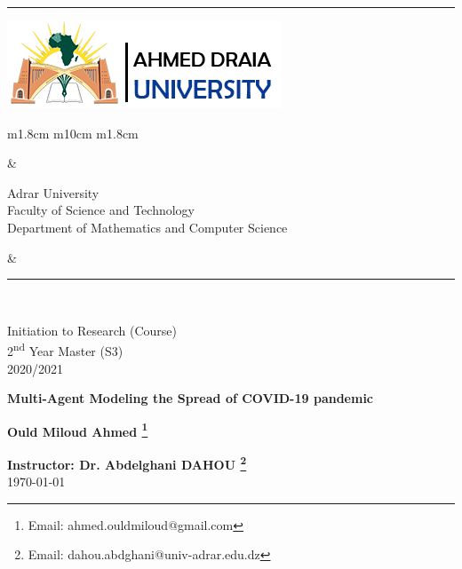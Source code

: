 \documentclass[paper=a4, fontsize=11.5pt]{scrartcl}
\numberwithin{equation}{section}		%
\numberwithin{figure}{section}			%
\numberwithin{table}{section}				%
\newcommand{\horrule}[1]{\rule{\linewidth}{#1}} 	%
\begin{document}
		
{\flushleft\horrule{2pt}
\begin{center}
{\includegraphics[height=0.09\textwidth]{Figs/logo_english.png}} 
\begin{tabular}{ m{1.8cm} m{10cm} m{1.8cm}}
\begin{center}
\end{center}
&
\begin{center} 
{\small
{Adrar University} \\
{Faculty of Science and Technology} \\
{Department of Mathematics and Computer Science}} \\

\end{center}
&

\begin{center}
\end{center}
\end{tabular}
\end{center}
\flushleft \horrule{2pt}\\[1cm]
}


\begin{center}

{
\huge  
Initiation to Research (Course) \\
\vspace{0.2cm}
2\textsuperscript{nd} Year Master (S3) \\
\vspace{0.2cm}
2020/2021}\\

\vspace{1cm}

{
\Huge   
\textbf{Multi-Agent Modeling the Spread of COVID-19 pandemic }}\\
\vspace{1cm}

{
\Large
\textbf{Ould Miloud Ahmed \footnote{Email: ahmed.ouldmiloud@gmail.com}}}\\
\vspace{4.5cm}

{
\large
\textbf{Instructor: Dr. Abdelghani DAHOU \footnote{Email: dahou.abdghani@univ-adrar.edu.dz}}}\\
\today
\end{center}
\pagebreak
\tableofcontents
\pagebreak
\listoffigures
\pagebreak
\listoftables
\pagebreak
\doublespacing
\end{document}
